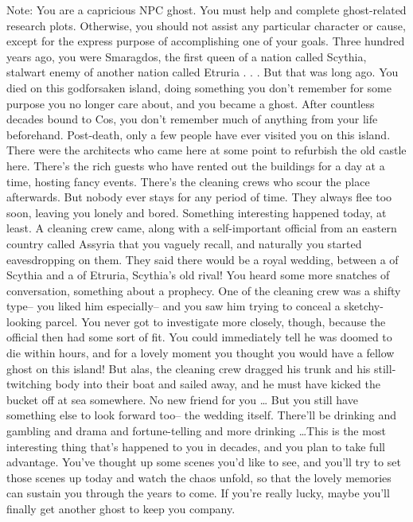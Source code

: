 \documentclass[char]{Kos}
\begin{document}
\name{\cEmeraldQueen{}}

	Note: You are a capricious NPC ghost. You must help \cAnarchist{} and \cButler{} complete ghost-related research plots. Otherwise, you should not assist any particular character or cause, except for the express purpose of accomplishing one of your goals.
	Three hundred years ago, you were Smaragdos, the first queen of a nation called Scythia, stalwart enemy of another nation called Etruria . . . But that was long ago. You died on this godforsaken island, doing something you don't remember for some purpose you no longer care about, and you became a ghost. After countless decades bound to Cos, you don't remember much of anything from your life beforehand.
	 Post-death, only a few people have ever visited you on this island. There were the architects who came here at some point to refurbish the old castle here. There's the rich guests who have rented out the buildings for a day at a time, hosting fancy events. There's the cleaning crews who scour the place afterwards. But nobody ever stays for any period of time. They always flee too soon, leaving you lonely and bored.
	 Something interesting happened today, at least. A cleaning crew came, along with a self-important official from an eastern country called Assyria that you vaguely recall, and naturally you started eavesdropping on them. They said there would be a royal wedding, between a \cBride{\prince} of Scythia and a \cGroom{\prince} of Etruria, Scythia's old rival! You heard some more snatches of conversation, something about a prophecy. One of the cleaning crew was a shifty type-- you liked him especially-- and you saw him trying to conceal a sketchy-looking parcel. You never got to investigate more closely, though, because the official then had some sort of fit. You could immediately tell he was doomed to die within hours, and for a lovely moment you thought you would have a fellow ghost on this island! But alas, the cleaning crew dragged his trunk and his still-twitching body into their boat and sailed away, and he must have kicked the bucket off at sea somewhere. No new friend for you \ldots
	 But you still have something else to look forward too-- the wedding itself. There'll be drinking and gambling and drama and fortune-telling and more drinking \ldots This is the most interesting thing that's happened to you in decades, and you plan to take full advantage. You've thought up some scenes you'd like to see, and you'll try to set those scenes up today and watch the chaos unfold, so that the lovely memories can sustain you through the years to come.
	 If you're really lucky, maybe you'll finally get another ghost to keep you company.
\end{document}
